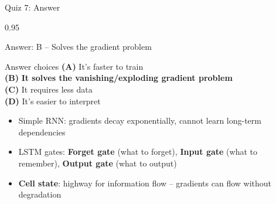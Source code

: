\documentclass[9pt, aspectratio=169, t]{beamer}
\begin{document}
\begin{frame}{Quiz 7: Answer}
    \begin{cminipage}{0.95\textwidth}
    {\small
    \begin{exampleblock}{Answer: B -- Solves the gradient problem}
    \begin{block}{Answer choices}
        \textcolor{MainBlue}{\textbf{(A)}} It's faster to train \incorrect\\[2pt]
        \textcolor{MainBlue}{\textbf{(B)}} \textbf{\textcolor{Forest}{It solves the vanishing/exploding gradient problem}} \correct\\[2pt]
        \textcolor{MainBlue}{\textbf{(C)}} It requires less data \incorrect\\[2pt]
        \textcolor{MainBlue}{\textbf{(D)}} It's easier to interpret \incorrect
    \end{block}

        \vspace{0.1cm}

        \begin{itemize}\setlength{\itemsep}{0pt}
            \item Simple RNN: gradients decay exponentially, cannot learn long-term dependencies
            \item LSTM gates: \textbf{Forget gate} (what to forget), \textbf{Input gate} (what to remember), \textbf{Output gate} (what to output)
            \item \textbf{Cell state}: highway for information flow -- gradients can flow without degradation
        \end{itemize}
    \end{exampleblock}
    }
    \end{cminipage}
\end{frame}
\end{document}
